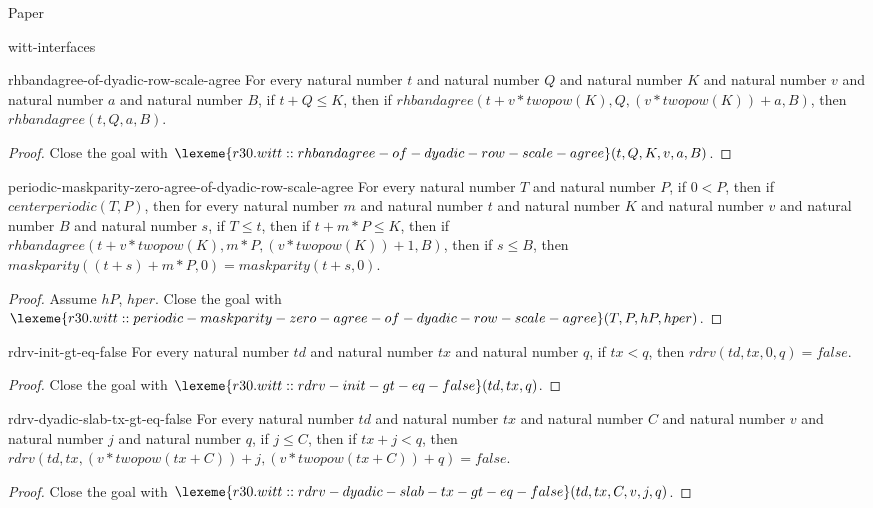 \begin{lexlean}{Paper}
\begin{section}{witt-interfaces}
  \begin{theorem}{rhbandagree-of-dyadic-row-scale-agree}
  For every natural number \(t\) and natural number \(Q\) and natural number \(K\) and natural number \(v\) and natural number \(a\) and natural number \(B\), if \(t + Q ≤ K\), then if \(rhbandagree(t + v * twopow(K), Q, (v * twopow(K)) + a, B)\), then \(rhbandagree(t, Q, a, B)\).
  \begin{proof}
  Close the goal with \(\lexeme{r30.witt::rhbandagree-of-dyadic-row-scale-agree}(t, Q, K, v, a, B)\).
  \end{proof}
  \end{theorem}

  \begin{theorem}{periodic-maskparity-zero-agree-of-dyadic-row-scale-agree}
  For every natural number \(T\) and natural number \(P\), if \(0 < P\), then if \(centerperiodic(T, P)\), then for every natural number \(m\) and natural number \(t\) and natural number \(K\) and natural number \(v\) and natural number \(B\) and natural number \(s\), if \(T ≤ t\), then if \(t + m * P ≤ K\), then if \(rhbandagree(t + v * twopow(K), m * P, (v * twopow(K)) + 1, B)\), then if \(s ≤ B\), then \(maskparity((t + s) + m * P, 0) = maskparity(t + s, 0)\).
  \begin{proof}
  Assume \(hP\), \(hper\).
  Close the goal with \(\lexeme{r30.witt::periodic-maskparity-zero-agree-of-dyadic-row-scale-agree}(T, P, hP, hper)\).
  \end{proof}
  \end{theorem}

  \begin{theorem}{rdrv-init-gt-eq-false}
  For every natural number \(td\) and natural number \(tx\) and natural number \(q\), if \(tx < q\), then \(rdrv(td, tx, 0, q) = false\).
  \begin{proof}
  Close the goal with \(\lexeme{r30.witt::rdrv-init-gt-eq-false}(td, tx, q)\).
  \end{proof}
  \end{theorem}

  \begin{theorem}{rdrv-dyadic-slab-tx-gt-eq-false}
  For every natural number \(td\) and natural number \(tx\) and natural number \(C\) and natural number \(v\) and natural number \(j\) and natural number \(q\), if \(j ≤ C\), then if \(tx + j < q\), then \(rdrv(td, tx, (v * twopow(tx + C)) + j, (v * twopow(tx + C)) + q) = false\).
  \begin{proof}
  Close the goal with \(\lexeme{r30.witt::rdrv-dyadic-slab-tx-gt-eq-false}(td, tx, C, v, j, q)\).
  \end{proof}
  \end{theorem}


\end{section}
\end{lexlean}
